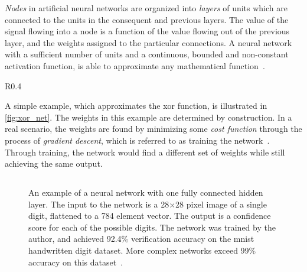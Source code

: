 \documentclass[\rootfolder/main.tex]{subfiles}
\begin{document}
\emph{Nodes} in artificial neural networks are organized into \emph{layers} of units which are connected to the units in the consequent and previous layers.
The value of the signal flowing into a node is a function of the value flowing out of the previous layer, and the weights assigned to the particular connections.
A neural network with a sufficient number of units and a continuous, bounded and non-constant activation function, is able to approximate any mathematical function~\cite{Cybenko1989}\cite{Hornik1991}.

\begin{wrapfigure}{R}{0.4\columnwidth}
    \caption{\acrshort{xor} network, illustrating how neurons can implement basic logic functions.}
    \label{fig:xor_net}
\end{wrapfigure}

A simple example, which approximates the \acrfull{xor} function, is illustrated in \cref{fig:xor_net}.
The weights in this example are determined by construction.
In a real scenario, the weights are found by minimizing some \emph{cost function} through the process of \emph{gradient descent}, which is referred to as training the network~\cite{Mitchell1997}.
Through training, the network would find a different set of weights while still achieving the same output.


\subsection{}

\begin{figure}
    \caption[An example of a neural network with one fully connected hidden layer.]%
            {An example of a neural network with one fully connected hidden layer. %
            The input to the network is a 28$\times$28 pixel image of a single digit, flattened to a 784 element vector. %
            The output is a confidence score for each of the possible digits. %
            The network was trained by the author, and achieved 92.4\% verification accuracy on the \acrshort{mnist} handwritten digit dataset. %
            More complex networks exceed 99\% accuracy on this dataset~\cite{mnist2010}.}
    \label{fig:mnist-net}
\end{figure}
\end{document}
